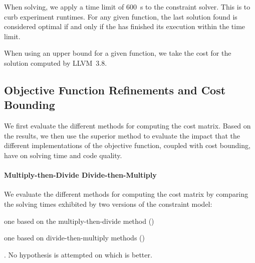 When solving, we apply a time limit of \SI{600}{\s} to the \gls{constraint
  solver}.
%
This is to curb experiment runtimes.
%
For any given \gls{function}, the last \gls{solution} found is considered
optimal if and only if the  has finished its
execution within the time limit.

When using an upper bound for a given \gls{function}, we take the cost for the
\gls{solution} computed by \mbox{\gls{LLVM} 3.8}.


\subsection{Objective Function Refinements and Cost Bounding}

We first evaluate the different methods for computing the cost matrix.
%
Based on the results, we then use the superior method to evaluate the impact
that the different implementations of the \gls{objective function}, coupled with
cost bounding, have on solving time and code quality.


\paragraph{Multiply-then-Divide \versus Divide-then-Multiply}

We evaluate the different methods for computing the cost matrix by
comparing the solving times exhibited by two versions of the \gls{constraint
  model}:
%
\begin{modelList}
  \item {}
    one based on the \gls{multiply-then-divide method}
    ()
  \item {}
    one based on \glspl{divide-then-multiply method}
    ()
\end{modelList}.
%
No hypothesis is attempted on which  is better.



